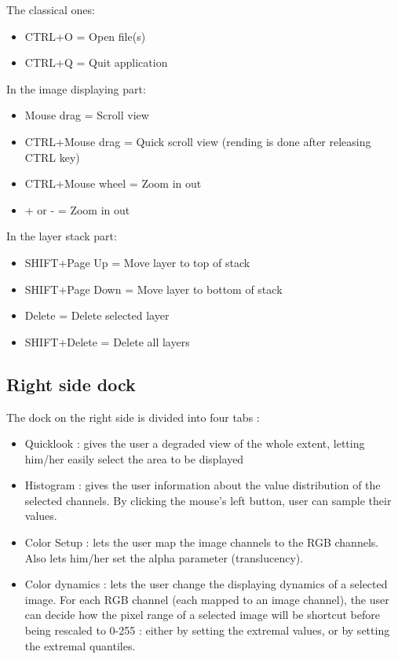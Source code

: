 The classical ones:
\begin{itemize}
\item CTRL+O = Open file(s)
\item CTRL+Q = Quit application
\end{itemize}

In the image displaying part:
\begin{itemize}
\item Mouse drag = Scroll view
\item CTRL+Mouse drag = Quick scroll view (rending is done after releasing CTRL key)
\item CTRL+Mouse wheel = Zoom in out
\item + or - = Zoom in out
\end{itemize}

In the layer stack part:
\begin{itemize}
\item SHIFT+Page Up = Move layer to top of stack
\item SHIFT+Page Down = Move layer to bottom of stack
\item Delete = Delete selected layer
\item SHIFT+Delete = Delete all layers
\end{itemize}


\subsection{Right side dock}
The dock on the right side is divided into four tabs : 
\begin{itemize}
\item Quicklook : gives the user a degraded view of the whole extent, letting him/her easily select the area to be displayed 
\item Histogram : gives the user information about the value distribution of the selected channels. By clicking the mouse's left button, user can sample their values.
\item Color Setup : lets the user map the image channels to the RGB channels. Also lets him/her set the alpha parameter (translucency).
\item Color dynamics : lets the user change the displaying dynamics of a selected image. For each RGB channel (each mapped to an image channel), the user can decide how the pixel range of a selected image will be shortcut before being rescaled to 0-255 : either by setting the extremal values, or by setting the extremal quantiles.
\end{itemize}

